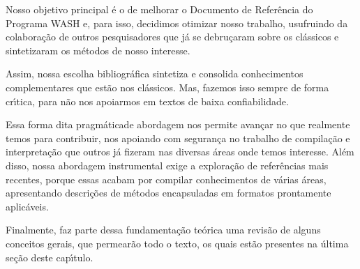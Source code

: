 \documentclass[
12pt,		%
openright,	%
twoside,  %
a4paper,			%
chapter=TITLE,		%
english,			%
french,				%
spanish,			%
brazil				%
]{USPSC-classe/USPSC}
\begin{document}
Nosso objetivo principal \'e o de melhorar o Documento de Refer\^encia do Programa WASH e, para isso, decidimos otimizar nosso trabalho, usufruindo da colabora\c{c}\~ao de outros pesquisadores que j\'a se debru\c{c}aram sobre os cl\'assicos e  sintetizaram os m\'etodos de nosso interesse.

















Assim, nossa escolha bibliogr\'afica sintetiza e consolida conhecimentos complementares que est\~ao nos cl\'assicos. Mas, fazemos isso sempre de forma cr\'{\i}tica, para n\~ao nos apoiarmos em textos de baixa confiabilidade.

















Essa forma dita \textquotedbl pragm\'atica\textquotedbl  de abordagem nos permite avan\c{c}ar no que realmente temos para contribuir, nos apoiando com seguran\c{c}a no trabalho de compila\c{c}\~ao e interpreta\c{c}\~ao que outros j\'a fizeram nas diversas \'areas onde temos interesse. Al\'em disso, nossa abordagem instrumental exige a explora\c{c}\~ao de refer\^encias mais recentes, porque essas acabam por compilar conhecimentos de v\'arias \'areas, apresentando descri\c{c}\~oes de m\'etodos encapsuladas em formatos prontamente aplic\'aveis.

















Finalmente, faz parte dessa fundamenta\c{c}\~ao te\'orica uma revis\~ao de alguns conceitos gerais, que permear\~ao todo o texto, os quais est\~ao presentes na \'ultima se\c{c}\~ao deste cap\'{\i}tulo.
\end{document}
